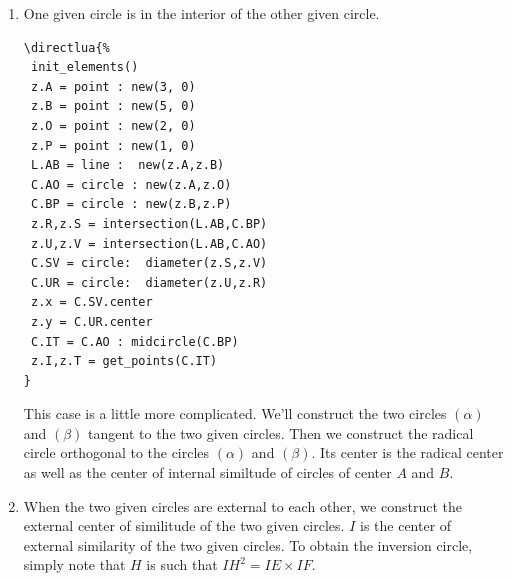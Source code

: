 \begin{enumerate}[label=(\roman*)]
\item  One given circle is in the interior of the other given circle.
\label{midcircle_diameter}

\begin{minipage}{.45\textwidth}
\begin{Verbatim}
\directlua{%
 init_elements()
 z.A = point : new(3, 0)
 z.B = point : new(5, 0)
 z.O = point : new(2, 0)
 z.P = point : new(1, 0)
 L.AB = line :  new(z.A,z.B)
 C.AO = circle : new(z.A,z.O)
 C.BP = circle : new(z.B,z.P)
 z.R,z.S = intersection(L.AB,C.BP)
 z.U,z.V = intersection(L.AB,C.AO)
 C.SV = circle:  diameter(z.S,z.V)
 C.UR = circle:  diameter(z.U,z.R)
 z.x = C.SV.center
 z.y = C.UR.center
 C.IT = C.AO : midcircle(C.BP)
 z.I,z.T = get_points(C.IT)
}
\end{Verbatim}
\end{minipage}
\begin{minipage}{.45\textwidth}
\begin{center}
\end{center}

\end{minipage}

This case is a little more complicated. We'll construct the two circles $(\alpha)$ and $(\beta)$ tangent to the two given circles. Then we construct the radical circle orthogonal to the circles $(\alpha)$ and $(\beta)$. Its center is the radical center as well as the center of internal similtude of circles of center $A$ and $B$.

\item When the two given circles are external to each other,  we  construct  the external center of similitude of the two given circles.
$I$ is the center of external similarity of the two given circles. To obtain the inversion circle, simply note that $H$ is such that $IH^2= IE\times IF$. \label{tangent_from}


\end{enumerate}

